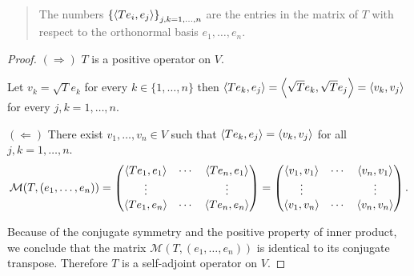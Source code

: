 \begin{quote}
    The numbers ${\{ \left\langle{Te_{i}, e_{j}}\right\rangle \}}_{j,k=1,\ldots, n}$ are the entries in the matrix of $T$ with respect to the orthonormal basis $e_{1}, \ldots, e_{n}$.
\end{quote}

\begin{proof}
    $(\Rightarrow)$ $T$ is a positive operator on $V$.

    Let $v_{k} = \sqrt{T}e_{k}$ for every $k\in\{1,\ldots,n\}$ then $\left\langle{Te_{k}, e_{j}}\right\rangle = \left\langle{\sqrt{T}e_{k}, \sqrt{T}e_{j}}\right\rangle = \left\langle{v_{k}, v_{j}}\right\rangle$ for every $j, k = 1,\ldots,n$.

    $(\Leftarrow)$ There exist $v_{1}, \ldots, v_{n} \in V$ such that $\left\langle{Te_{k}, e_{j}}\right\rangle = \left\langle{v_{k}, v_{j}}\right\rangle$ for all $j, k = 1,\ldots, n$.
    \[
        \mathcal{M}(T, (e_{1}, \ldots, e_{n})) =
        \begin{pmatrix}
            \left\langle{Te_{1}, e_{1}}\right\rangle & \cdots & \left\langle{Te_{n}, e_{1}}\right\rangle \\
            \vdots                    &        & \vdots                    \\
            \left\langle{Te_{1}, e_{n}}\right\rangle & \cdots & \left\langle{Te_{n}, e_{n}}\right\rangle
        \end{pmatrix} =
        \begin{pmatrix}
            \left\langle{v_{1}, v_{1}}\right\rangle & \cdots & \left\langle{v_{n}, v_{1}}\right\rangle \\
            \vdots                   &        & \vdots                   \\
            \left\langle{v_{1}, v_{n}}\right\rangle & \cdots & \left\langle{v_{n}, v_{n}}\right\rangle
        \end{pmatrix}.
    \]

    Because of the conjugate symmetry and the positive property of inner product, we conclude that the matrix $\mathcal{M}(T, (e_{1}, \ldots, e_{n}))$ is identical to its conjugate transpose. Therefore $T$ is a self-adjoint operator on $V$.


\end{proof}
